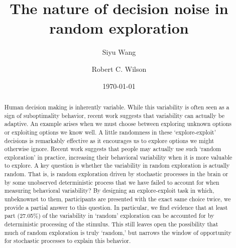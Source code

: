 \documentclass[12pt]{article}
\title{The nature of decision noise in random exploration}
\author[1]{Siyu Wang}
\author[1,2]{Robert C. Wilson}
\affil[1]{Department of Psychology, University of Arizona, Tucson AZ USA}
\affil[2]{Cognitive Science Program, University of Arizona, Tucson AZ USA}
\date{\today}
\begin{document}
	\maketitle
	
	\newpage
	\begin{abstract}
	
Human decision making is inherently variable. While this variability is often seen as a sign of suboptimality behavior, recent work suggests that variability can actually be adaptive. An example arises when we must choose between exploring unknown options or exploiting options we know well. A little randomness in these `explore-exploit' decisions is remarkably effective as it encourages us to explore options we might otherwise ignore. Recent work suggests that people may actually use such `random exploration' in practice, increasing their behavioral variability when it is more valuable to explore. 
A key question is whether the variability in random exploration is actually random. That is, is random exploration driven by stochastic processes in the brain or by some unobserved deterministic process that we have failed to account for when measuring behavioral variability? By designing an explore-exploit task in which, unbeknownst to them, participants are presented with the exact same choice twice, we provide a partial answer to this question. In particular, we find evidence that at least part (27.05\%) of the variability in `random' exploration can be accounted for by deterministic processing of the stimulus. This still leaves open the possibility that much of random exploration is truly `random,' but narrows the window of opportunity for stochastic processes to explain this behavior.

\end{abstract}
	\newpage
\end{document}
